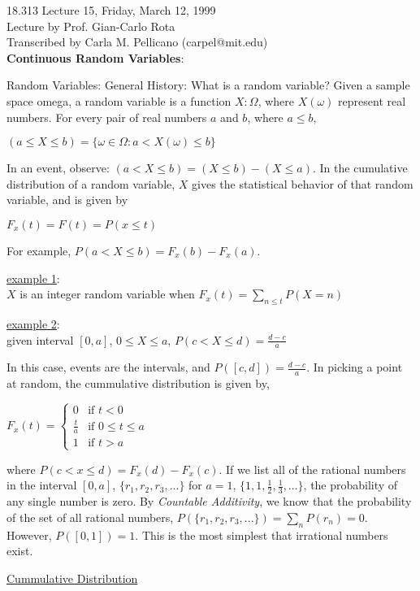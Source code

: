 {\Large 18.313 Lecture 15, Friday, March 12, 1999}\\
{\large Lecture by Prof. Gian-Carlo Rota}\\
Transcribed by Carla M. Pellicano (carpel@mit.edu)\\

{\bf Continuous Random Variables}:

Random Variables:
General History:  What is a random variable?  Given a sample space omega, a random variable is a function $X:\Omega$, where $X(\omega)$ represent real numbers.  For every pair of real numbers $a$ and $b$, where $a \leq b$, 

$(a\leq X\leq b)=\lbrace{\omega \in \Omega:a < X(\omega) \leq b \rbrace}$

In an event, observe: $(a<X\leq b) = (X\leq b) - (X\leq a)$.  In the cumulative distribution of a random variable, $X$ gives the statistical behavior of that random variable, and is given by

$F_x(t) = F(t)=P(x\leq t)$

For example, $P(a<X\leq b)=F_x(b)-F_x(a)$.

\underline{example 1}:\\
$X$ is an integer random variable when $F_x(t) = \displaystyle\sum_{n\leq t} P(X=n)$

\underline{example 2}:\\
given interval $[0,a]$, $0\leq X\leq a$, $P(c<X\leq d)=\frac{d-c}{a}$

In this case, events are the intervals, and $P([c,d])=\frac{d-c}{a}$.  In picking a point at random, the cummulative distribution is given by,

$F_x(t) = \left\{ \begin{array} {lll} 0 &\mbox{if $t<0$}\\\frac{t}{a} &\mbox{if $0\leq t\leq a$}\\1 & \mbox{if $t>a$}\end{array} \right.$

where $P(c<x\leq d)=F_x(d)-F_x(c)$.  If we list all of the rational numbers in the interval $[0,a]$, $\lbrace{r_1, r_2, r_3, ...\rbrace}$ for $a=1$, $\lbrace{1, 1, \frac{1}{2}, \frac{1}{3},...\rbrace}$, the probability of any single number is zero.  By {\em Countable Additivity}, we know that the probability of the set of all rational numbers, $P(\lbrace{r_1, r_2, r_3,...\rbrace})=\sum_n P(r_n)=0$.  However, $P([0,1]) = 1$.  This is the most simplest that irrational numbers exist.

\underline{Cummulative Distribution}

